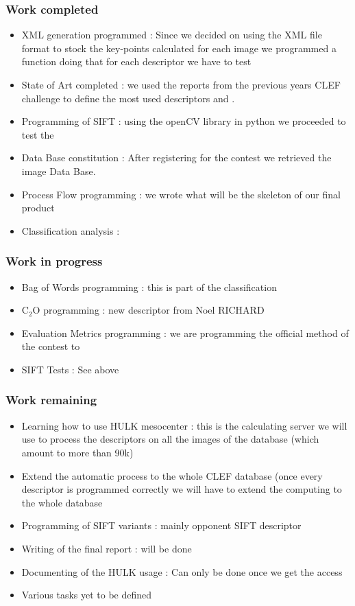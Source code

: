 \documentclass[12pt]{article}
\begin{document}
\subsubsection*{Work completed}
\begin{itemize}
  \item XML generation programmed : Since we decided on using the XML file format to stock the key-points calculated for each image we programmed a function doing that for each descriptor we have to test
  \item State of Art completed : we used the reports from the previous years CLEF challenge to define the most used descriptors and .
  \item Programming of SIFT : using the openCV library in python we proceeded to test the
  \item Data Base constitution : After registering for the contest we retrieved the image Data Base.
  \item Process Flow programming : we wrote what will be the skeleton of our final product
  \item Classification analysis :
\end{itemize}

\subsubsection*{Work in progress}
\begin{itemize}
  \item Bag of Words programming : this is part of the classification
  \item C$_2$O programming : new descriptor from Noel RICHARD
  \item Evaluation Metrics programming : we are programming the official method of the contest to
  \item SIFT Tests : See above
\end{itemize}

\subsubsection*{Work remaining}
\begin{itemize}
  \item Learning how to use HULK mesocenter : this is the calculating server we will use to process the descriptors on all the images of the database (which amount to more than 90k)
  \item Extend the automatic process to the whole CLEF database (once every descriptor is programmed correctly we will have to extend the computing to the whole database
  \item Programming of SIFT variants : mainly opponent SIFT descriptor
  \item Writing of the final report : will be done
  \item Documenting of the HULK usage : Can only be done once we get the access
  \item Various tasks yet to be defined
\end{itemize}
\end{document}
